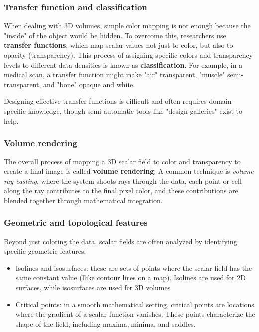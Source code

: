 \subsubsection{Transfer function and classification}
When dealing with 3D volumes, simple color mapping is not enough because the "inside" of the object would be hidden. To overcome this, researchers use \textbf{transfer functions}, which map scalar values not just to color, but also to opacity (transparency). This process of assigning specific colors and transparency levels to different data densities is known as \textbf{classification}. For example, in a medical scan, a transfer function might make "air" transparent, "muscle" semi-transparent, and "bone" opaque and white.\par
Designing effective transfer functions is difficult and often requires domain-specific knowledge, though semi-automatic tools like "design galleries" exist to help.

\subsubsection{Volume rendering}
The overall process of mapping a 3D scalar field to color and transparency to create a final image is called \textbf{volume rendering}. A common technique is \textit{volume ray casting}, where the system shoots rays through the data, each point or cell along the ray contributes to the final pixel color, and these contributions are blended together through mathematical integration.

\subsubsection{Geometric and topological features}
Beyond just coloring the data, scalar fields are often analyzed by identifying specific geometric features:
\begin{itemize}[noitemsep]
    \item Isolines and isosurfaces: these are sets of points where the scalar field has the same constant value (llike contour lines on a map). Isolines are used for 2D surfaces, while isosurfaces are used for 3D volumes
    \item Critical points: in a smooth mathematical setting, critical points are locations where the gradient of a scalar function vanishes. These points characterize the shape of the field, including maxima, minima, and saddles.
\end{itemize}

